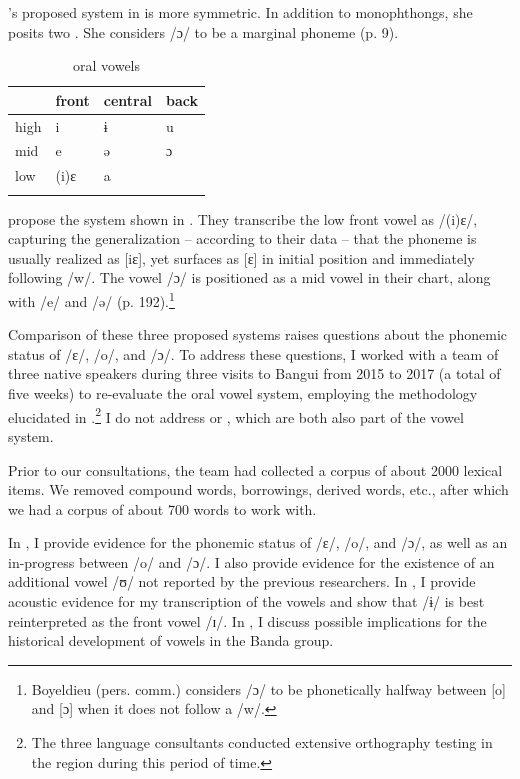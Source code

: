 \documentclass[output=paper,colorlinks,citecolor=brown]{langscibook}
\begin{document}
\citeauthor{Théret-Kieschke1998}’s proposed system in  is more  symmetric. In addition to monophthongs, she posits two . She considers /ɔ/ to be a marginal phoneme  (p. 9).

\begin{table}
\caption{ oral vowels \citep[191]{BoyeldieuCloarec-Heiss2001}}
\label{tab:olson:3}
    \begin{tabularx}{.8\textwidth}{XXXX}
    \lsptoprule
                & front & central & back\\
    \midrule
    high        & i     & ɨ       & u\\
    mid         & e     & ə       & ɔ\\
    low         & (i)ɛ  & a       &\\
    \lspbottomrule
    \end{tabularx}
\end{table}

\citeauthor{BoyeldieuCloarec-Heiss2001} propose the system shown in . They transcribe the low front vowel as /(i)ɛ/, capturing the generalization -- according to their data -- that the phoneme is usually realized as [iɛ], yet surfaces as [ɛ] in initial position and immediately following /w/. The vowel /ɔ/ is positioned as a mid vowel in their chart, along with /e/ and /ə/ (p. 192).\footnote{Boyeldieu (pers. comm.) considers /ɔ/ to be phonetically halfway between [o] and [ɔ] when it does not follow a /w/.}

Comparison of these three proposed systems  raises questions about the phonemic status of /ɛ/, /o/, and /ɔ/. To address these questions, I worked with a team of three native  speakers during three visits to Bangui from 2015 to 2017 (a total of five weeks) to re-evaluate the oral vowel system, employing the  methodology elucidated in \citet{Kutsch-Lojenga1996}.\footnote{The three language consultants conducted extensive orthography testing in the  region during this period of time.}  I do not address  or , which are both also part of the   vowel system.

Prior to our consultations, the team had collected a corpus of about 2000 lexical items. We removed compound words, borrowings, derived words, etc., after which we had a corpus of about 700 words to work with.

In , I provide evidence for the phonemic status of /ɛ/, /o/, and /ɔ/, as well as an in-progress  between /o/ and /ɔ/. I also provide evidence for the existence of an additional vowel /ʊ/ not reported by the previous researchers. In , I provide acoustic evidence for my transcription of the vowels and show that /ɨ/ is best reinterpreted as the front vowel /ɪ/. In , I discuss possible implications for the historical development of vowels in the Banda  group.
\end{document}
